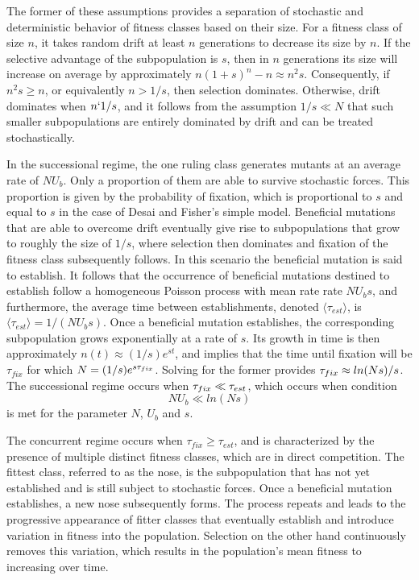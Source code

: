 \documentclass[12pt]{article}
\begin{document}
The former of these assumptions provides a separation of stochastic and deterministic behavior of fitness classes based on their size.  For a fitness class of size $n$, it takes random drift at least $n$ generations to decrease its size by $n$.  If the selective advantage of the subpopulation is $s$, then in $n$ generations its size will increase on average by approximately $n(1+s)^n-n \approx n^2s$.  Consequently, if $n^2s \ge n$, or equivalently $n>1/s$, then selection dominates.  Otherwise, drift dominates when $n\lq 1/s$, and it follows from the assumption $1/s \ll N$ that such smaller subpopulations are entirely dominated by drift and can be treated stochastically.

In the successional regime, the one ruling class generates mutants at an average rate of $N U_b$.  Only a proportion of them are able to survive stochastic forces.  This proportion is given by the probability of fixation, which is proportional to $s$ and equal to $s$ in the case of Desai and Fisher's simple model.  Beneficial mutations that are able to overcome drift eventually give rise to subpopulations that grow to roughly the size of $1/s$, where selection then dominates and fixation of the fitness class subsequently follows.  In this scenario the beneficial mutation is said to establish.  It follows that the occurrence of beneficial mutations destined to establish follow a homogeneous Poisson process with mean rate rate $NU_b s$, and furthermore, the average time between establishments, denoted $\langle \tau_{est} \rangle$, is $\langle \tau_{est} \rangle = 1/(N U_b s)$.  Once a beneficial mutation establishes, the corresponding subpopulation grows exponentially at a rate of $s$.  Its growth in time is then approximately $n(t)\approx (1/s) e^{st}$, and implies that the time until fixation will be $\tau_{fix}$ for which $N =(1/s)e^{s \tau_{\footnotesize fix}}$.  Solving for the former provides $\tau_{\footnotesize fix} \approx ln(Ns)/s$.  The successional regime occurs when $\tau_{\footnotesize fix} \ll \tau_{\footnotesize est}$, which occurs when condition
\[ N U_b \ll ln(Ns) \] 
is met for the parameter $N$, $U_b$ and $s$. 

The concurrent regime occurs when $\tau_{fix} \ge \tau_{est}$, and is characterized by the presence of multiple distinct fitness classes, which are in direct competition.  The fittest class, referred to as the nose, is the subpopulation that has not yet established and is still subject to stochastic forces.  Once a beneficial mutation establishes, a new nose subsequently forms.  The process repeats and leads to the progressive appearance of fitter classes that eventually establish and introduce variation in fitness into the population.  Selection on the other hand continuously removes this variation, which results in the population's mean fitness to increasing over time.  
\end{document}
